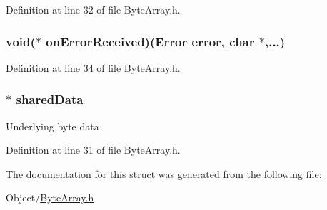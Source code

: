 Definition at line 32 of file ByteArray.h.

\hypertarget{struct_m_i_byte_array_aeb0776cff292839518da5f5a48884fd9}{
\subsubsection[{onErrorReceived}]{\setlength{\rightskip}{0pt plus 5cm}void($\ast$ {\bf onErrorReceived})({\bf Error} error, char $\ast$,...)}}
\label{struct_m_i_byte_array_aeb0776cff292839518da5f5a48884fd9}


Definition at line 34 of file ByteArray.h.

\hypertarget{struct_m_i_byte_array_a2092be3761112a91b7da551b8f834b02}{
\subsubsection[{sharedData}]{$\ast$ {\bf sharedData}}}
\label{struct_m_i_byte_array_a2092be3761112a91b7da551b8f834b02}
Underlying byte data 

Definition at line 31 of file ByteArray.h.



The documentation for this struct was generated from the following file:\begin{DoxyCompactItemize}
\item 
Object/\hyperlink{_m_i_byte_array_8h}{ByteArray.h}\end{DoxyCompactItemize}
